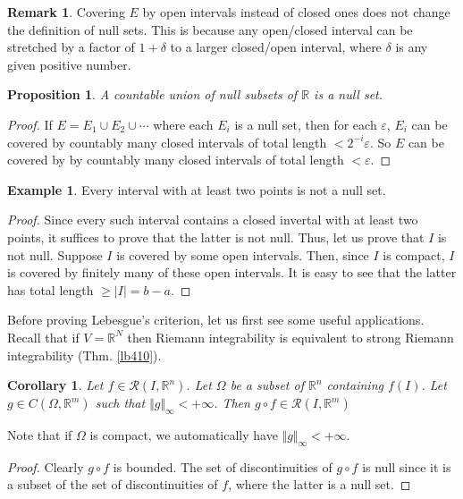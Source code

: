 \documentclass[12pt,b5paper,notitlepage]{article}
\theoremstyle{definition}
\newtheorem{eg}[df]{Example}
\newtheorem{rem}[df]{Remark}
\theoremstyle{plain}
\newtheorem{pp}[df]{Proposition}
\newtheorem{co}[df]{Corollary}
\newcommand{\scr}{\mathscr}
\newcommand{\Rbb}{\mathbb R}
\newcommand{\eps}{\varepsilon}
\numberwithin{equation}{section}
\begin{document}
\begin{rem}
Covering $E$ by open intervals instead of closed ones does not change the definition of null sets. This is because any open/closed interval can be stretched by a factor of $1+\delta$ to a larger closed/open interval, where $\delta$ is any given positive number.
\end{rem}


\begin{pp}\label{lb412}
A countable union of null subsets of $\Rbb$ is a null set.
\end{pp}

\begin{proof}
If $E=E_1\cup E_2\cup\cdots$ where each $E_i$ is a null set, then for each $\eps$, $E_i$ can be covered by countably many closed intervals of total length $<2^{-i}\eps$. So $E$ can be covered by by countably many closed intervals of total length $<\eps$.
\end{proof}


\begin{eg}
Every interval with at least two points is not a null set.
\end{eg}

\begin{proof}
Since every such interval contains a closed invertal with at least two points, it suffices to prove that the latter is not null. Thus, let us prove that $I$ is not null. Suppose $I$ is covered by some open intervals. Then, since $I$ is compact, $I$ is covered by finitely many of these open intervals. It is easy to see that the latter has total length $\geq|I|= b-a$.
\end{proof}



Before proving Lebesgue's criterion, let us first see some useful applications. Recall that if $V=\Rbb^N$ then Riemann integrability is equivalent to strong Riemann integrability (Thm. \ref{lb410}).

\begin{co}
Let $f\in\scr R(I,\Rbb^n)$. Let $\Omega$ be a subset of $\Rbb^n$ containing $f(I)$. Let $g\in C(\Omega,\Rbb^m)$ such that $\Vert g\Vert_\infty<+\infty$. Then $g\circ f\in\scr R(I,\Rbb^m)$
\end{co}

Note that if $\Omega$ is compact, we automatically have $\Vert g\Vert_\infty<+\infty$.

\begin{proof}
Clearly $g\circ f$ is bounded. The set of discontinuities of $g\circ f$ is null since it is a subset of the set of discontinuities of $f$, where the latter is a null set.
\end{proof}
\end{document}
